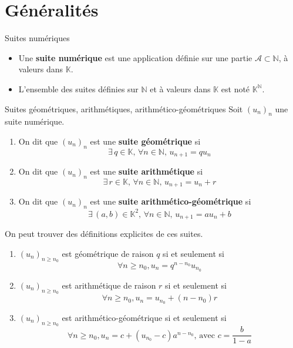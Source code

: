 
\section{Généralités}

    \begin{defi}{Suites numériques}{}
        \begin{itemize}
            \item Une \textbf{suite numérique} est une application définie sur une partie $\mathcal{A} \subset \mathbb{N}$, à valeurs dans $\mathbb{K}$.
            \item L’ensemble des suites définies sur $\mathbb{N}$ et à valeurs dans $\mathbb{K}$ est noté $\mathbb{K}^{\mathbb{N}}$.
        \end{itemize}
    \end{defi}

    \begin{prop}{Suites géométriques, arithmétiques, arithmético-géométriques}{}
        Soit $(u_n)_n$ une suite numérique.
        \begin{enumerate}
            \item On dit que $(u_n)_n$ est une \textbf{suite géométrique} si 
            \[ \exists \, q \in \mathbb{K}, \, \forall n \in \mathbb{N}, \, u_{n+1} = qu_n \]
            \item On dit que $(u_n)_n$ est une \textbf{suite arithmétique} si 
            \[ \exists \, r \in \mathbb{K}, \, \forall n \in \mathbb{N}, \, u_{n+1} = u_n + r \]
            \item On dit que $(u_n)_n$ est une \textbf{suite arithmético-géométrique} si 
            \[ \exists \, (a,b) \in \mathbb{K}^2, \, \forall n \in \mathbb{N}, \, u_{n+1} = au_n + b \]
        \end{enumerate}
        On peut trouver des définitions explicites de ces suites.
        \begin{enumerate}
            \item $(u_n)_{n \geq n_0}$ est géométrique de raison $q$ si et seulement si \[ \forall n \geq n_0, u_n = q^{n-n_0} u_{n_0} \]
            \item $(u_n)_{n \geq n_0}$ est arithmétique de raison $r$ si et seulement si \[ \forall n \geq n_0, u_n = u_{n_0} + (n - n_0)r \]
            \item $(u_n)_{n \geq n_0}$ est arithmético-géométrique si et seulement si \[\forall n \geq n_0, u_n = c + (u_{n_0} - c)a^{n-n_0} \text{, avec } c = \frac{b}{1-a} \]
        \end{enumerate}
    \end{prop}

